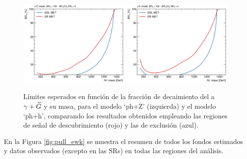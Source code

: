 \begin{figure}[ht!]
  \centering

    \includegraphics[width=0.49\textwidth]{images/analysis_EWK/plots_exp_excl_ewk/expected_limit_mass_vs_BR_yZ_cmp_SRL_vs_SR.png}
    \includegraphics[width=0.49\textwidth]{images/analysis_EWK/plots_exp_excl_ewk/expected_limit_mass_vs_BR_yh_cmp_SRL_vs_SR.png}

    \caption{Límites esperados en función de la fracción de decaimiento del \ninoone a $\gamma+\widetilde{G}$ y su masa, para el modelo `ph+Z' (izquierda) y el modelo `ph+h', comparando los resultados obtenidos empleando las regiones de señal de descubrimiento (rojo) y las de exclusión (azul).}
    \label{fig:sre_ewk}

\end{figure}

En la Figura \ref{fig:pull_ewk} se muestra el resumen de todos los fondos estimados y datos observados (excepto en las SRs) en todas las regiones del análisis.



